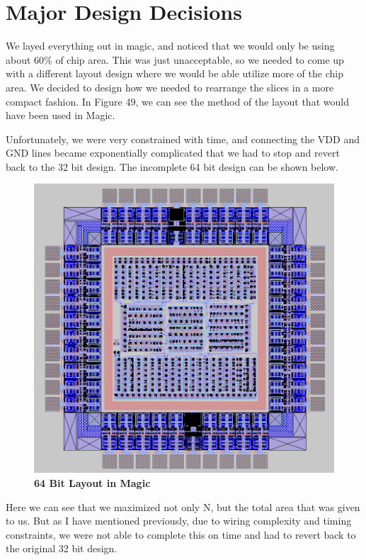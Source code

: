 \documentclass[a4paper]{article}
\begin{document}
\section{\textbf{Major Design Decisions}}
    We layed everything out in magic, and noticed that we would only be using about 60\% of chip area. This was
    just unacceptable, so we needed to come up with a different layout design where we would be able utilize more
    of the chip area. We decided to design how we needed to rearrange the slices in a more compact fashion. In Figure 49,
    we can see the method of the layout that would have been used in Magic.

    Unfortunately, we were very constrained with time, and connecting the VDD and GND lines became exponentially complicated
    that we had to stop and revert back to the 32 bit design. The incomplete 64 bit design can be shown below.

    \begin{figure}[H]
        \centering
        \includegraphics[width=\textwidth,height=\textheight,keepaspectratio]{../../magic/64_bit/layout/magic_layout_64.png}
        \caption{\textbf{64 Bit Layout in Magic}}
        \label{fig:gg}
    \end{figure}

    Here we can see that we maximized not only N, but the total area that was given to us. But as I have mentioned previously, due
    to wiring complexity and timing constraints, we were not able to complete this on time and had to revert back to the original
    32 bit design.
\end{document}
